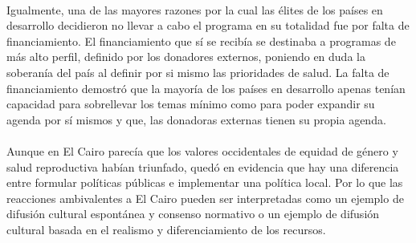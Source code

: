 \documentclass[10pt,spanish,letterpaper]{article}
\theoremstyle{plain}
\begin{document}
\\
Igualmente, una de las mayores razones por la cual las \'elites de los pa\'ises en desarrollo decidieron no llevar a cabo el programa en su totalidad fue por falta de financiamiento. El financiamiento que s\'i se recib\'ia se destinaba a programas de m\'as alto perfil, definido por los donadores externos, poniendo en duda la soberan\'ia del pa\'is al definir por si mismo las prioridades de salud. La falta de financiamiento demostr\'o que la mayor\'ia de los pa\'ises en desarrollo apenas ten\'ian capacidad para sobrellevar los temas m\'inimo como para poder expandir su agenda por s\'i mismos y que, las donadoras externas tienen su propia agenda.\\
\\
Aunque en El Cairo parec\'ia que los valores occidentales de equidad de g\'enero y salud reproductiva hab\'ian triunfado, qued\'o en evidencia que hay una diferencia entre formular pol\'iticas p\'ublicas e implementar una pol\'itica local. Por lo que las reacciones ambivalentes a El Cairo pueden ser interpretadas como un ejemplo de difusi\'on cultural espont\'anea y consenso normativo o un ejemplo de difusi\'on cultural basada en el realismo y diferenciamiento de los recursos.


\end{document}
